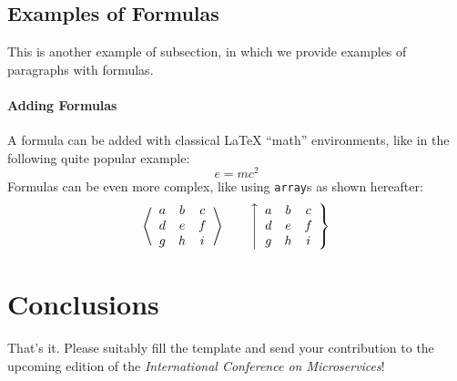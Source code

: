 \documentclass{article}
\begin{document}
\subsection{Examples of Formulas}
This is another example of subsection, in which we provide examples of paragraphs with formulas.

\paragraph{Adding Formulas}
A formula can be added with classical \LaTeX{} \enquote{math} environments, like in the following quite popular example: 
$$ e = mc^2 $$
Formulas can be even more complex, like using \texttt{array}s as shown hereafter:
\[
\left\langle
\begin{array}{ccc}
a & b & c \\ d & e & f \\ g & h & i 
\end{array}
\right\rangle
\qquad
\left\uparrow
\begin{array}{ccc}
a & b & c \\
d & e & f \\
g & h & i 
\end{array}
\right\}
\]

\section{Conclusions}
That's it. Please suitably fill the template and send your contribution to the upcoming edition of the \textit{International Conference on Microservices}! \Smiley
\end{document}

